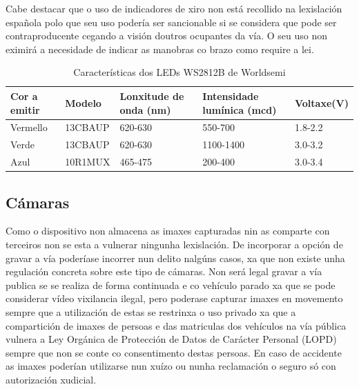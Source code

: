 Cabe destacar que o uso de indicadores de xiro non está recollido na lexislación española polo que seu uso podería ser sancionable si se considera que pode ser contraproducente cegando a visión doutros ocupantes da vía. O seu uso non eximirá a necesidade de indicar as manobras co brazo como require a lei.
\begin{table}[tbp]
  \caption{Características dos LEDs WS2812B de Worldsemi}
    \label{tab:intensidade_leds}
    \begin{center}
        \begin{tabular}{|l|l|l|l|l|}
            \hline
             Cor a emitir & Modelo & Lonxitude de onda (nm) & Intensidade lumínica (mcd)&Voltaxe(V)\\ \hline
             Vermello & 13CBAUP & 620-630 & 550-700 & 1.8-2.2\\ \hline
             Verde & 13CBAUP & 620-630 & 1100-1400 & 3.0-3.2\\ \hline
             Azul & 10R1MUX & 465-475 & 200-400 & 3.0-3.4\\ \hline
        \end{tabular}
    \end{center}
\end{table}

\subsection{Cámaras}

Como o dispositivo non almacena as imaxes capturadas nin as comparte con terceiros non se esta a vulnerar ningunha lexislación. De incorporar a opción de gravar a vía poderíase incorrer nun delito nalgúns casos, xa que non existe unha regulación concreta sobre este tipo de cámaras.
 Non será legal gravar a vía publica se se realiza de forma continuada e co vehículo parado xa que se pode considerar vídeo vixilancia ilegal, pero poderase capturar imaxes en movemento sempre que a utilización de estas se restrinxa o uso privado xa que a compartición de imaxes de persoas e das matriculas dos vehículos na vía pública vulnera a Ley Orgánica de Protección de Datos de Carácter Personal (LOPD)~\cite{BOEEsDocumento} sempre que non se conte co consentimento destas persoas. En caso de accidente as imaxes poderían utilizarse nun xuízo ou nunha reclamación o seguro só con autorización xudicial.
